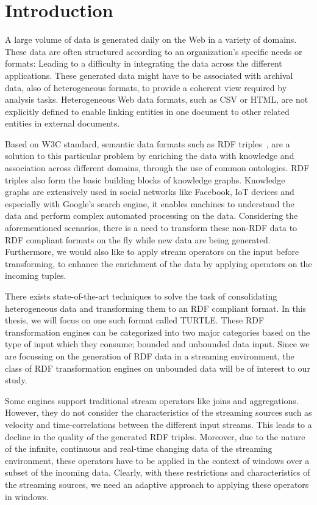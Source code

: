 \chapter{Introduction}

A large volume of data is generated daily on the Web in a variety of domains. These
data are often structured according to an organization's specific needs or formats: Leading to
a difficulty in integrating the data across the different applications.
These generated data might have to be associated with archival data, also of heterogeneous formats,
to provide a coherent view required by analysis tasks. Heterogeneous Web data formats, such as CSV or HTML, are not explicitly
defined to enable linking entities in one document to other related entities in external documents.

Based on W3C standard, semantic data formats such as RDF triples~\cite{intro_rdf}, are a solution to
this particular problem by enriching the data with knowledge and association across
different domains, through the use of common ontologies. RDF triples also form the basic building blocks of knowledge graphs.
Knowledge graphs are extensively used in social networks like Facebook\cite{facebook_linked_data}, IoT devices\cite{graph_of_things} and especially with Google's search
engine\cite{google_kg}, it enables machines to understand the data and perform complex automated processing
on the data. Considering the aforementioned scenarios, there is a need to transform these non-RDF data to RDF compliant formats on the fly while
new data are being generated. Furthermore, we would also like to apply stream operators on the input
before transforming, to enhance the enrichment of the data by applying operators on the incoming tuples.

There exists state-of-the-art techniques to solve the task of consolidating heterogeneous data
and transforming them to an RDF compliant format. In this thesis, we will focus on one such format called TURTLE.
These RDF transformation engines can be categorized into two major categories based on the type of input
which they consume; bounded and unbounded data input. Since we are focussing on the generation of RDF data
in a streaming environment, the class of RDF transformation engines on unbounded data will be of interest to our study.

Some engines support traditional stream operators like joins and aggregations. However, they do not consider
the characteristics of the streaming sources such as velocity and time-correlations between the different
input streams. This leads to a decline in the quality of the generated RDF triples. Moreover,
due to the nature of the infinite, continuous and real-time changing data of the streaming environment,
these operators have to be applied in the context of windows over a subset of the incoming data.
Clearly, with these restrictions and characteristics of the streaming sources, we need an adaptive approach
to applying these operators in windows.


